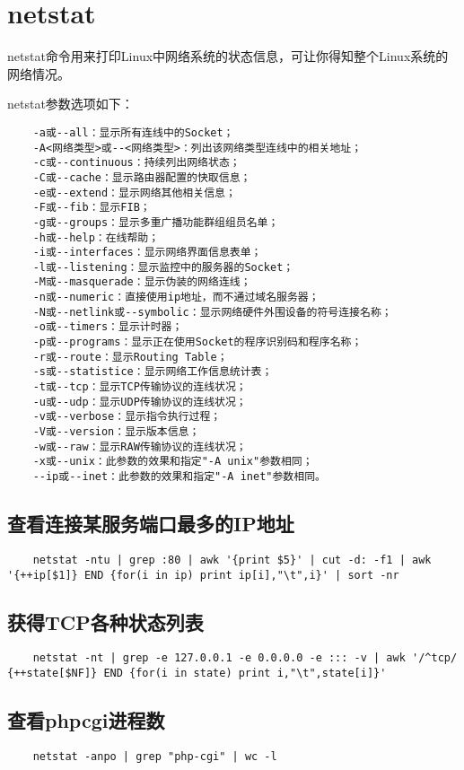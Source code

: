 \documentclass[a4paper,left=2.5cm,right=2.5cm,11pt]{article}
\begin{document}
\section{netstat}
	netstat命令用来打印Linux中网络系统的状态信息，可让你得知整个Linux系统的网络情况。\par

	netstat参数选项如下：
	\begin{lstlisting}
	-a或--all：显示所有连线中的Socket； 
	-A<网络类型>或--<网络类型>：列出该网络类型连线中的相关地址； 
	-c或--continuous：持续列出网络状态； 
	-C或--cache：显示路由器配置的快取信息； 
	-e或--extend：显示网络其他相关信息； 
	-F或--fib：显示FIB； 
	-g或--groups：显示多重广播功能群组组员名单； 
	-h或--help：在线帮助； 
	-i或--interfaces：显示网络界面信息表单； 
	-l或--listening：显示监控中的服务器的Socket； 
	-M或--masquerade：显示伪装的网络连线； 
	-n或--numeric：直接使用ip地址，而不通过域名服务器； 
	-N或--netlink或--symbolic：显示网络硬件外围设备的符号连接名称； 
	-o或--timers：显示计时器； 
	-p或--programs：显示正在使用Socket的程序识别码和程序名称； 
	-r或--route：显示Routing Table； 
	-s或--statistice：显示网络工作信息统计表； 
	-t或--tcp：显示TCP传输协议的连线状况； 
	-u或--udp：显示UDP传输协议的连线状况； 
	-v或--verbose：显示指令执行过程； 
	-V或--version：显示版本信息； 
	-w或--raw：显示RAW传输协议的连线状况； 
	-x或--unix：此参数的效果和指定"-A unix"参数相同； 
	--ip或--inet：此参数的效果和指定"-A inet"参数相同。
	\end{lstlisting}

\subsection{查看连接某服务端口最多的IP地址}
	\begin{lstlisting}
	netstat -ntu | grep :80 | awk '{print $5}' | cut -d: -f1 | awk '{++ip[$1]} END {for(i in ip) print ip[i],"\t",i}' | sort -nr
	\end{lstlisting}

\subsection{获得TCP各种状态列表}
	\begin{lstlisting}
	netstat -nt | grep -e 127.0.0.1 -e 0.0.0.0 -e ::: -v | awk '/^tcp/ {++state[$NF]} END {for(i in state) print i,"\t",state[i]}'
	\end{lstlisting}

\subsection{查看phpcgi进程数}
	\begin{lstlisting}
	netstat -anpo | grep "php-cgi" | wc -l
	\end{lstlisting}
\end{document}
